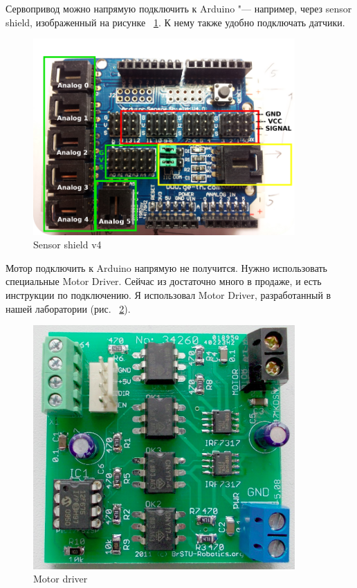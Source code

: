 \documentclass[10pt, a5paper]{article}
\begin{document}
Сервопривод можно напрямую подключить к Arduino "--- например, через sensor shield, изображенный на рисунке ~\ref{Sklipus3}. К нему также удобно подключать датчики.

\begin{figure}[h!]
  \centering
  \includegraphics[width=10cm]{w_09_2016_Sklipus3.png}
  \caption {Sensor shield v4}\label{Sklipus3}
\end{figure}


Мотор подключить к Arduino напрямую не получится. Нужно использовать специальные Motor Driver. Сейчас из достаточно много в продаже, и есть инструкции по подключению. Я использовал Motor Driver, разработанный в нашей лаборатории (рис. ~\ref{Sklipus4}).

\begin{figure}[h!]
  \centering
  \includegraphics[width=10cm]{w_09_2016_Sklipus4.png}
  \caption {Motor driver}\label{Sklipus4}
\end{figure}
\end{document}
